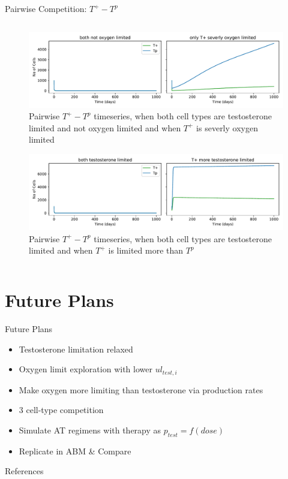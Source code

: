 \documentclass[aspectratio=169,9pt]{beamer}
\begin{document}
\begin{frame}{Pairwise Competition: $T^+ - T^p$}
\begin{columns}
\begin{column}{0.4\textwidth}
      \begin{figure}[h]
        \centering
        \includegraphics[width=\textwidth]{Tpos-Tpro_o2lims}
        \caption{Pairwise $T^+ - T^p$ timeseries, when both cell types are testosterone limited and not oxygen limited and when $T^+$ is severly oxygen limited}
        \label{fig_Tpos-Tpro_o2lims}
      \end{figure}
      \begin{figure}[h]
        \centering
        \includegraphics[width=\textwidth]{Tpos-Tpro_testlims}
        \caption{Pairwise $T^+ - T^p$ timeseries, when both cell types are testosterone limited and when $T^+$ is limited more than $T^p$}
        \label{fig_Tpos-Tpro_testlims}
      \end{figure}
    \end{column}
  \end{columns}
\end{frame}

\section{Future Plans}
\begin{frame}{Future Plans}
  \begin{itemize}
    \item Testosterone limitation relaxed
    \item Oxygen limit exploration with lower $ul_{test,i}$
    \item Make oxygen more limiting than testosterone via production rates
    \item 3 cell-type competition
    \item Simulate AT regimens with therapy as $p_{test} = f(dose)$
    \item Replicate in ABM \& Compare
  \end{itemize}
\end{frame}

\begin{frame}[allowframebreaks]{References}
  \printbibliography
\end{frame}
\end{document}
